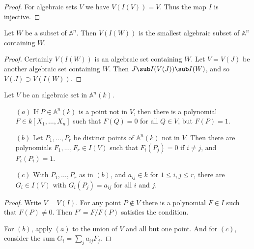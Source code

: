 \begin{proof}
For algebraic sets $V$ we have $V(I(V))=V$. Thus the map $I$ is injective.
\end{proof}
\begin{proposition}
Let $W$ be a subset of $\mathbb{A}^n$. Then $V(I(W))$ is the smallest algebraic subset of $\mathbb{A}^n$ containing $W$.
\end{proposition}
\begin{proof}
Certainly $V(I(W))$ is an algebraic set containing $W$. Let $V=V(J)$ be another algebraic set containing $W$. Then $J\sub I(V(J))\sub I(W)$, and so $V(J)\supset V(I(W))$.
\end{proof}
\begin{proposition}\label{algebraic set separate}
Let $V$ be an algebraic set in $\mathbb{A}^n(k)$.
\begin{itemize}
\item[$(a)$] If $P\in\mathbb{A}^n(k)$ is a point not in $V$, then there is a polynomial $F\in k[X_1,\dots,X_n]$ such that $F(Q)=0$ for all $Q\in V$, but $F(P)=1$.
\item[$(b)$] Let $P_1,\dots,P_r$ be distinct points of $\mathbb{A}^n(k)$ not in $V$. Then there are polynomials $F_1,\dots,F_r\in I(V)$ such that $F_i(P_j)=0$ if $i\neq j$, and $F_i(P_i)=1$.
\item[$(c)$] With $P_1,\dots,P_r$ as in $(b)$, and $a_{ij}\in k$ for $1\leq i,j\leq r$, there are $G_i\in I(V)$ with $G_i(P_j)=a_{ij}$ for all $i$ and $j$.
\end{itemize} 
\end{proposition}
\begin{proof}
Write $V=V(I)$. For any point $P\notin V$ there is a polynomial $F\in I$ such that $F(P)\neq 0$. Then $F'=F/F(P)$ satisfies the condition.\par
For $(b)$, apply $(a)$ to the union of $V$ and all but one point. And for $(c)$, consider the sum $G_i=\sum_j a_{ij}F_j$.
\end{proof}
